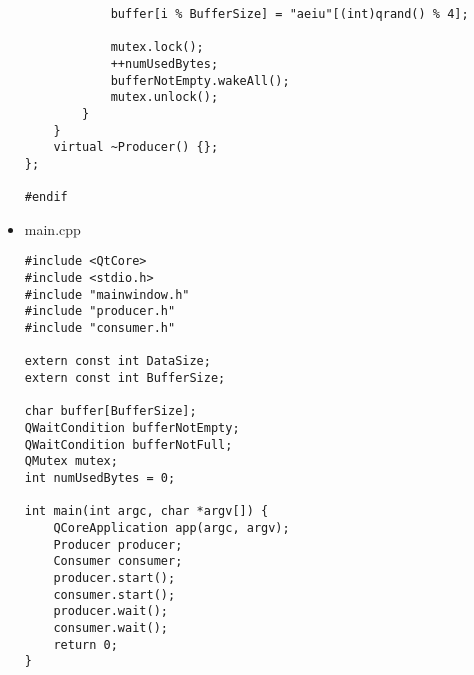 \documentclass[9pt,b5paper]{article}
\begin{document}
\begin{itemize}
\begin{lstlisting}
            buffer[i % BufferSize] = "aeiu"[(int)qrand() % 4];

            mutex.lock();
            ++numUsedBytes;
            bufferNotEmpty.wakeAll();
            mutex.unlock();
        }
    }
    virtual ~Producer() {};
};

#endif
\end{lstlisting}
\item main.cpp
\lstset{language=java,label= ,caption= ,numbers=none}
\begin{lstlisting}
#include <QtCore>
#include <stdio.h>
#include "mainwindow.h"
#include "producer.h"
#include "consumer.h"

extern const int DataSize;
extern const int BufferSize;

char buffer[BufferSize];
QWaitCondition bufferNotEmpty;
QWaitCondition bufferNotFull;
QMutex mutex;
int numUsedBytes = 0;

int main(int argc, char *argv[]) {
    QCoreApplication app(argc, argv);
    Producer producer;
    Consumer consumer;
    producer.start();
    consumer.start();
    producer.wait();
    consumer.wait();
    return 0;
}
\end{lstlisting}
\end{itemize}
\end{document}
